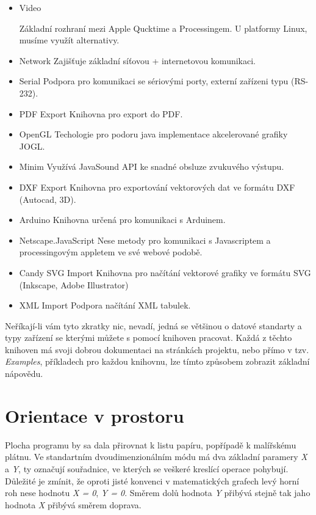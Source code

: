 \documentclass[11pt]{article} %
\begin{document}
\begin{itemize}
\item
Video

Základní rozhraní mezi Apple Qucktime a Processingem. U platformy Linux, musíme využít alternativy.

\item
Network
Zajišťuje základní síťovou + internetovou komunikaci. 

\item
Serial
Podpora pro komunikaci se sériovými porty, externí zařízeni typu (RS-232).

\item
PDF Export
Knihovna pro export do PDF.

\item
OpenGL
Techologie pro podoru java implementace akcelerované grafiky JOGL.

\item
Minim
Využívá JavaSound API ke snadné obsluze zvukuvého výstupu.

\item
DXF Export
Knihovna pro exportování vektorových dat ve formátu DXF (Autocad, 3D).

\item
Arduino
Knihovna určená pro komunikaci s Arduinem.

\item
Netscape.JavaScript
Nese metody pro komunikaci s Javascriptem a processingovým appletem ve své webové podobě.

\item
Candy SVG Import
Knihovna pro načítání vektorové grafiky ve formátu SVG (Inkscape, Adobe Illustrator)

\item
XML Import
Podpora načítání XML tabulek.
\end{itemize}

Neříkají-li vám tyto zkratky nic, nevadí, jedná se většinou o datové standarty a typy zařízení se kterými můžete s pomocí knihoven pracovat. Každá z těchto knihoven má svoji dobrou dokumentaci na stránkách projektu, nebo přímo v tzv. {\em Examples}, příkladech pro každou knihovnu, lze tímto způsobem zobrazit základní nápovědu. 

\newpage
\section{Orientace v prostoru}

Plocha programu by sa dala přirovnat k listu papíru, popřípadě k malířskému plátnu. Ve standartním dvoudimenzionálním módu má dva základní paramery {\em X} a {\em Y}, ty označují souřadnice, ve kterých se veškeré kreslící operace pohybují. Důležité je zmínit, že oproti jisté konvenci v matematických grafech levý horní roh nese hodnotu {\em X = 0}, {\em Y = 0}. Směrem dolů hodnota {\em Y} přibývá stejně tak jaho hodnota {\em X} přibývá směrem doprava.\\
\end{document}
